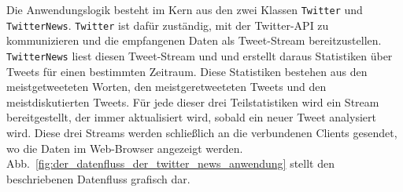 Die Anwendungslogik besteht im Kern aus den zwei Klassen \lstinline|Twitter| und \lstinline|TwitterNews|.
\lstinline|Twitter| ist dafür zuständig, mit der Twitter-API zu kommunizieren und die empfangenen Daten als Tweet-Stream bereitzustellen.
\lstinline|TwitterNews| liest diesen Tweet-Stream und und erstellt daraus Statistiken über Tweets für einen bestimmten Zeitraum.
Diese Statistiken bestehen aus den meistgetweeteten Worten, den meistgeretweeteten Tweets und den meistdiskutierten Tweets.
Für jede dieser drei Teilstatistiken wird ein Stream bereitgestellt, der immer aktualisiert wird, sobald ein neuer Tweet analysiert wird.
Diese drei Streams werden schließlich an die verbundenen Clients gesendet, wo die Daten im Web-Browser angezeigt werden.
Abb.~\ref{fig:der_datenfluss_der_twitter_news_anwendung} stellt den beschriebenen Datenfluss grafisch dar.



